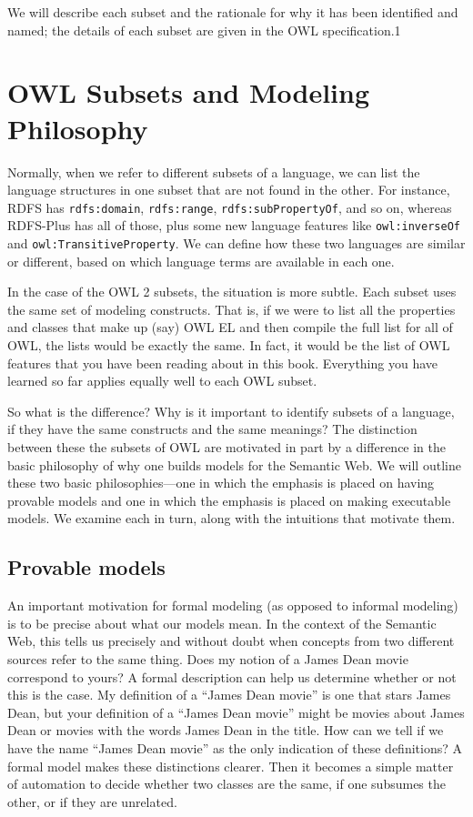 We will describe each subset and the rationale for why it has been
identified and named; the details of each subset are given in the OWL
specification.1

\section{OWL Subsets and Modeling Philosophy}

Normally, when we refer to different subsets of a language, we can list
the language structures in one subset that are not found in the other.
For instance, RDFS has \texttt{rdfs:domain}, \texttt{rdfs:range}, \texttt{rdfs:subPropertyOf}, and
so on, whereas RDFS-Plus has all of those, plus some new language
features like \texttt{owl:inverseOf} and \texttt{owl:TransitiveProperty}. We can define
how these two languages are similar or different, based on which
language terms are available in each one.

In the case of the OWL 2 subsets, the situation is more subtle. Each
subset uses the same set of modeling constructs. That is, if we were to
list all the properties and classes that make up (say) OWL EL and then
compile the full list for all of OWL, the lists would be exactly the
same. In fact, it would be the list of OWL features that you have been
reading about in this book. Everything you have learned so far applies
equally well to each OWL subset.

So what is the difference? Why is it important to identify subsets of a
language, if they have the same constructs and the same meanings? The
distinction between these the subsets of OWL are motivated in part by a
difference in the basic philosophy of why one builds models for the
Semantic Web. We will outline these two basic philosophies---one in
which the emphasis is placed on having provable models and one in which
the emphasis is placed on making executable models. We examine each in
turn, along with the intuitions that motivate them.

\subsection{Provable models}

An important motivation for formal modeling (as opposed to informal
modeling) is to be precise about what our models mean. In the context of
the Semantic Web, this tells us precisely and without doubt when
concepts from two different sources refer to the same thing. Does my
notion of a James Dean movie correspond to yours? A formal description
can help us determine whether or not this is the case. My definition of
a ``James Dean movie'' is one that stars James Dean, but your definition
of a ``James Dean movie'' might be movies about James Dean or movies
with the words James Dean in the title. How can we tell if we have the
name ``James Dean movie'' as the only indication of these definitions? A
formal model makes these distinctions clearer. Then it becomes a simple
matter of automation to decide whether two classes are the same, if one
subsumes the other, or if they are unrelated.

